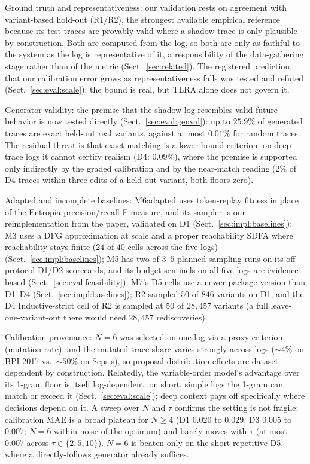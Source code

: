 \documentclass[runningheads]{llncs}
\newcommand{\chg}[1]{\textcolor{chgblue}{#1}}
\begin{document}
Ground truth and representativeness: our validation rests on agreement with variant-based hold-out (R1/R2), the strongest available empirical reference because its test traces are provably valid where a shadow trace is only plausible by construction. Both are computed from the log, so both are only as faithful to the system as the log is representative of it, a responsibility of the data-gathering stage rather than of the metric (Sect.~\ref{sec:related}). \chg{The registered prediction that our calibration error grows as representativeness falls was tested and refuted (Sect.~\ref{sec:eval:scale}); the bound is real, but TLRA alone does not govern it.}

\chg{Generator validity: the premise that the shadow log resembles valid future behavior is now tested directly (Sect.~\ref{sec:eval:genval}): up to $25.9\%$ of generated traces are exact held-out real variants, against at most $0.01\%$ for random traces. The residual threat is that exact matching is a lower-bound criterion: on deep-trace logs it cannot certify realism (D4: $0.09\%$), where the premise is supported only indirectly by the graded calibration and by the near-match reading ($2\%$ of D4 traces within three edits of a held-out variant, both floors zero).}

Adapted and incomplete baselines: M6adapted uses token-replay fitness in place of the Entropia precision/recall F-measure\chg{, and its sampler is our reimplementation from the paper, validated on D1} (Sect.~\ref{sec:impl:baselines}); M3 uses a DFG approximation \chg{at scale and a proper reachability SDFA where reachability stays finite ($24$ of $40$ cells across the five logs)} (Sect.~\ref{sec:impl:baselines}); M5 has two of $3$--$5$ planned sampling runs \chg{on its off-protocol D1/D2 scorecards, and its budget sentinels on all five logs are evidence-based (Sect.~\ref{sec:eval:feasibility})}; \chg{M7's D5 cells use a newer package version than D1--D4 (Sect.~\ref{sec:impl:baselines})}; R2 sampled $50$ of $846$ variants on D1\chg{, and the D4 Inductive-strict cell of R2 is sampled at $50$ of $28{,}457$ variants (a full leave-one-variant-out there would need $28{,}457$ rediscoveries)}.

Calibration provenance: $N{=}6$ was selected on one log via a proxy criterion (mutation rate), and the mutated-trace share varies strongly across logs ($\sim4\%$ on BPI 2017 vs.\ $\sim50\%$ on Sepsis), so proposal-distribution effects are dataset-dependent by construction. \chg{Relatedly, the variable-order model's advantage over its 1-gram floor is itself log-dependent: on short, simple logs the 1-gram can match or exceed it (Sect.~\ref{sec:eval:scale}); deep context pays off specifically where decisions depend on it.} \chg{A sweep over $N$ and $\tau$ confirms the setting is not fragile: calibration MAE is a broad plateau for $N\ge4$ (D1 $0.020$ to $0.029$, D3 $0.005$ to $0.007$; $N{=}6$ within noise of the optimum) and barely moves with $\tau$ (at most $0.007$ across $\tau\in\{2,5,10\}$). $N{=}6$ is beaten only on the short repetitive D5, where a directly-follows generator already suffices.}
\end{document}
